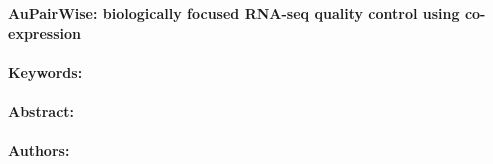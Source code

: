 \noindent
\large {\bf AuPairWise: biologically focused RNA-seq quality control using co-expression} 


\normalsize 


\noindent \paragraph{Keywords:} 

\noindent \paragraph{Abstract:} 



\noindent \paragraph{Authors:} 

